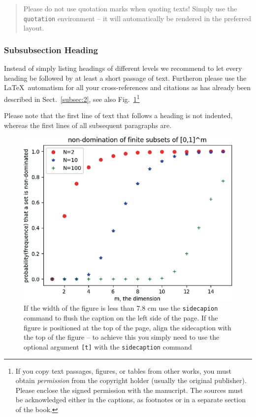 \begin{quotation}
    Please do not use quotation marks when quoting texts! Simply use the \verb|quotation| environment -- it will automatically be rendered in the preferred layout.
\end{quotation}


\subsubsection{Subsubsection Heading}
Instead of simply listing headings of different levels we recommend to let every heading be followed by at least a short passage of text. Furtheron please use the \LaTeX\ automatism for all your cross-references and citations as has already been described in Sect.~\ref{subsec:2}, see also Fig.~\ref{fig:1}\footnote{If you copy text passages, figures, or tables from other works, you must obtain \textit{permission} from the copyright holder (usually the original publisher). Please enclose the signed permission with the manucript. The sources must be acknowledged either in the captions, as footnotes or in a separate section of the book.}

Please note that the first line of text that follows a heading is not indented, whereas the first lines of all subsequent paragraphs are.

%
\begin{figure}[b]
    \sidecaption
    \includegraphics{figure}
    \caption{If the width of the figure is less than 7.8 cm use the \texttt{sidecapion} command to flush the caption on the left side of the page. If the figure is positioned at the top of the page, align the sidecaption with the top of the figure -- to achieve this you simply need to use the optional argument \texttt{[t]} with the \texttt{sidecaption} command}
    \label{fig:1}       %
\end{figure}


